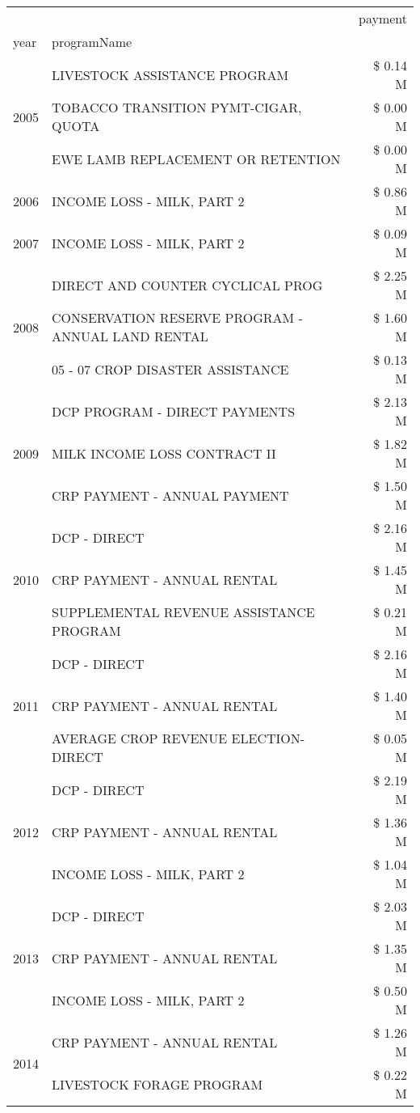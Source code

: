 \begin{tabular}{llr}
\toprule
 &  & payment \\
year & programName &  \\
\midrule
\multirow[t]{3}{*}{2005} & LIVESTOCK ASSISTANCE PROGRAM & \$ 0.14 M \\
 & TOBACCO TRANSITION PYMT-CIGAR, QUOTA & \$ 0.00 M \\
 & EWE LAMB REPLACEMENT OR RETENTION & \$ 0.00 M \\
\cline{1-3}
2006 & INCOME LOSS - MILK, PART 2 & \$ 0.86 M \\
\cline{1-3}
2007 & INCOME LOSS - MILK, PART 2 & \$ 0.09 M \\
\cline{1-3}
\multirow[t]{3}{*}{2008} & DIRECT AND COUNTER CYCLICAL PROG & \$ 2.25 M \\
 & CONSERVATION RESERVE PROGRAM - ANNUAL LAND RENTAL & \$ 1.60 M \\
 & 05 - 07 CROP DISASTER ASSISTANCE & \$ 0.13 M \\
\cline{1-3}
\multirow[t]{3}{*}{2009} & DCP PROGRAM - DIRECT PAYMENTS & \$ 2.13 M \\
 & MILK INCOME LOSS CONTRACT II & \$ 1.82 M \\
 & CRP PAYMENT - ANNUAL PAYMENT & \$ 1.50 M \\
\cline{1-3}
\multirow[t]{3}{*}{2010} & DCP - DIRECT & \$ 2.16 M \\
 & CRP PAYMENT - ANNUAL RENTAL & \$ 1.45 M \\
 & SUPPLEMENTAL REVENUE ASSISTANCE PROGRAM & \$ 0.21 M \\
\cline{1-3}
\multirow[t]{3}{*}{2011} & DCP - DIRECT & \$ 2.16 M \\
 & CRP PAYMENT - ANNUAL RENTAL & \$ 1.40 M \\
 & AVERAGE CROP REVENUE ELECTION-DIRECT & \$ 0.05 M \\
\cline{1-3}
\multirow[t]{3}{*}{2012} & DCP - DIRECT & \$ 2.19 M \\
 & CRP PAYMENT - ANNUAL RENTAL & \$ 1.36 M \\
 & INCOME LOSS - MILK, PART 2 & \$ 1.04 M \\
\cline{1-3}
\multirow[t]{3}{*}{2013} & DCP - DIRECT & \$ 2.03 M \\
 & CRP PAYMENT - ANNUAL RENTAL & \$ 1.35 M \\
 & INCOME LOSS - MILK, PART 2 & \$ 0.50 M \\
\cline{1-3}
\multirow[t]{3}{*}{2014} & CRP PAYMENT - ANNUAL RENTAL & \$ 1.26 M \\
 & LIVESTOCK FORAGE PROGRAM & \$ 0.22 M \\

\end{tabular}
